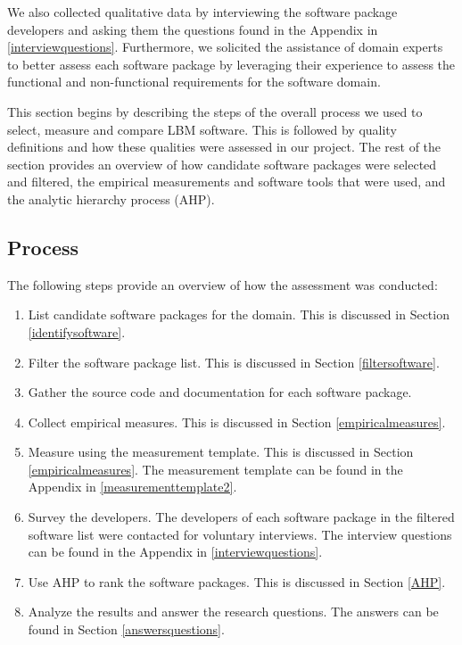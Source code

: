 \documentclass[12pt, notitlepage]{article}
\begin{document}
We also collected qualitative data by interviewing the software package developers and asking them the questions found in the Appendix in \ref{interviewquestions}. Furthermore, we solicited the assistance of domain experts to better assess each software package by leveraging their experience to assess the functional and non-functional requirements for the software domain. 

This section begins by describing the steps of the overall process we used to select, measure and compare LBM software. This is followed by quality definitions and how these qualities were assessed in our project. The rest of the section provides an overview of how candidate software packages were selected and filtered, the empirical measurements and software tools that were used, and the analytic hierarchy process (AHP). 

\subsection{Process}

 The following steps provide an overview of how the assessment was conducted: 

\begin{enumerate}
	\item List candidate software packages for the domain. This is discussed in Section \ref{identifysoftware}.
	\item Filter the software package list. This is discussed in Section \ref{filtersoftware}.
	\item Gather the source code and documentation for each software package.
	\item Collect empirical measures. This is discussed in Section \ref{empiricalmeasures}.
	\item Measure using the measurement template. This is discussed in Section \ref{empiricalmeasures}. The measurement template can be found in the Appendix in \ref{measurementtemplate2}.
	\item Survey the developers. The developers of each software package in the filtered software list were contacted for voluntary interviews. The interview questions can be found in the Appendix in \ref{interviewquestions}.
	\item Use AHP to rank the software packages. This is discussed in Section \ref{AHP}.
	\item Analyze the results and answer the research questions. The answers can be found in Section \ref{answersquestions}.
\end{enumerate}
\end{document}
